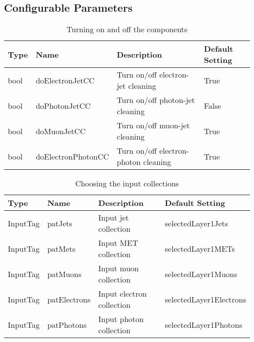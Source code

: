 \documentclass{cmspaper}
\begin{document}
\begin{appendix}
\section{Configurable Parameters}
\begin{table}[h]
\caption{Turning on and off the components}
\begin{center}
\begin{tabular}{l|l|l|l}
\textbf{Type} & \textbf{Name} & \textbf{Description} & \textbf{Default
    Setting} \\ \hline
    bool & doElectronJetCC   & Turn on/off electron-jet cleaning & True
    \\\hline
    bool & doPhotonJetCC     & Turn on/off photon-jet cleaning  & False
    \\\hline
    bool & doMuonJetCC       & Turn on/off muon-jet cleaning     & True
    \\\hline
    bool & doElectronPhotonCC& Turn on/off electron-photon cleaning & True
\end{tabular}
\end{center}
\label{tab:TurnOnModules}
\end{table}

\begin{table}[h]
\caption{Choosing the input collections}
\begin{center}
\begin{tabular}{l|l|l|l}
\textbf{Type} & \textbf{Name} & \textbf{Description} & \textbf{Default
Setting} \\ \hline
InputTag & patJets      & Input jet collection   & selectedLayer1Jets
\\\hline
InputTag & patMets      & Input MET collection   & selectedLayer1METs
\\\hline
InputTag & patMuons     & Input muon collection  & selectedLayer1Muons
\\\hline
InputTag & patElectrons & Input electron collection &
selectedLayer1Electrons 
\\\hline
InputTag & patPhotons   & Input photon collection& selectedLayer1Photons
\end{tabular}
\end{center}
\label{tab:InputCollections}
\end{table}


\end{appendix}
\end{document}
